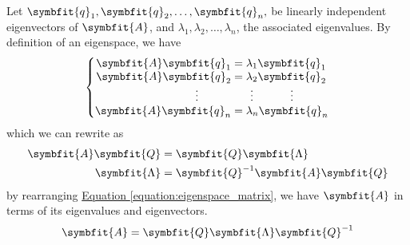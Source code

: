 \documentclass{article}
\begin{document}
	\begin{solution}[Proof]
		Let $\symbfit{q}_1, \symbfit{q}_2, \dots, \symbfit{q}_n,$ be linearly independent eigenvectors of $\symbfit{A}$, and $\lambda_1, \lambda_2, \dots, \lambda_n$, the associated eigenvalues. By definition of an eigenspace, we have
		\begin{equation*}
			\left\{
			\setlength\arraycolsep{0pt}
			\begin{array}{ r >{{}}c<{{}} l }
				\symbfit{A}\symbfit{q}_1 &=& \lambda_1 \symbfit{q}_1 \\
				\symbfit{A}\symbfit{q}_2 &=& \lambda_2 \symbfit{q}_2 \\
				\vdotswithin{\symbfit{q}_3} & & \vdotswithin{\lambda_3}\vdotswithin{\symbfit{q}_3} \\
				\symbfit{A}\symbfit{q}_n &=& \lambda_n \symbfit{q}_n
			\end{array}
			\right.
		\end{equation*}
		which we can rewrite as
		\begin{align}
			\symbfit{A}\symbfit{Q} &= \symbfit{Q}\symbfit{\Lambda} \label{equation:eigenspace_matrix} \\
			\symbfit{\Lambda}&=\symbfit{Q}^{-1}\symbfit{A}\symbfit{Q} \nonumber 
		\end{align}
		by rearranging \hyperref[equation:eigenspace_matrix]{Equation \ref{equation:eigenspace_matrix}}, we have $\symbfit{A}$ in terms of its eigenvalues and eigenvectors.
		\begin{equation*}
			\symbfit{A} = \symbfit{Q}\symbfit{\Lambda} \symbfit{Q}^{-1}
		\end{equation*}
	\end{solution}
\end{document}
